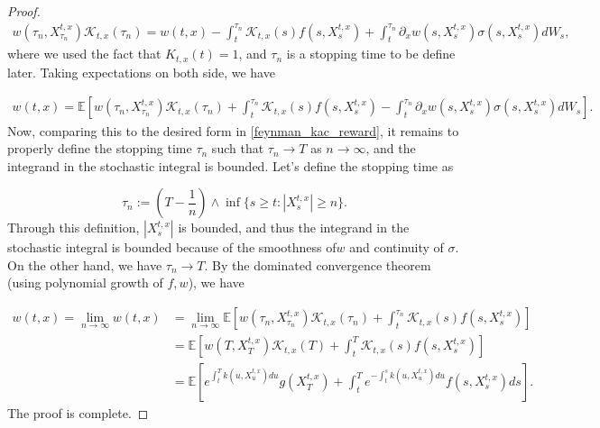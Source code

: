 \documentclass{article}
\begin{document}
\begin{proof}
\begin{equation*}
\begin{aligned}
w(\tau_n,X_{\tau_n}^{t,x})\mathcal{K}_{t,x}(\tau_n)=w(t,x)-\int_t^{\tau_n}\mathcal{K}_{t,x}(s)f(s,X_s^{t,x})+\int_t^{\tau_n}\partial_xw(s,X_s^{t,x})\sigma(s,X_s^{t,x})dW_s,
\end{aligned}
\end{equation*}
where we used the fact that $K_{t,x}(t)=1$, and $\tau_n$ is a stopping time to be define later. Taking expectations on both side, we have

\begin{equation*}
\begin{aligned}
w(t,x)=\mathbb{E}\left[w(\tau_n,X_{\tau_n}^{t,x})\mathcal{K}_{t,x}(\tau_n)+\int_t^{\tau_n}\mathcal{K}_{t,x}(s)f(s,X_s^{t,x})-\int_t^{\tau_n}\partial_xw(s,X_s^{t,x})\sigma(s,X_s^{t,x})dW_s\right].
\end{aligned}
\end{equation*}
Now, comparing this to the desired form in \eqref{feynman_kac_reward}, it remains to properly define the stopping time $\tau_n$ such that $\tau_n\rightarrow T$ as $n\rightarrow\infty$, and the integrand in the stochastic integral is bounded. Let's define the stopping time as

\begin{equation*}
\tau_n:=(T-\frac{1}{n})\wedge \inf \{s\geq t:|X_s^{t,x}|\geq n\}.
\end{equation*}
Through this definition, $|X_s^{t,x}|$ is bounded, and thus the integrand in the stochastic integral is bounded because of the smoothness of$w$ and continuity of $\sigma$. On the other hand, we have $\tau_n\rightarrow T$. By the dominated convergence theorem (using polynomial growth of $f,w$), we have

\begin{equation*}
\begin{aligned}
w(t,x)=\lim_{n\rightarrow\infty}w(t,x)&=\lim_{n\rightarrow\infty}\mathbb{E}\left[w(\tau_n,X_{\tau_n}^{t,x})\mathcal{K}_{t,x}(\tau_n)+\int_t^{\tau_n}\mathcal{K}_{t,x}(s)f(s,X_s^{t,x})\right]\\
&=\mathbb{E}\left[w(T,X_{T}^{t,x})\mathcal{K}_{t,x}(T)+\int_t^{T}\mathcal{K}_{t,x}(s)f(s,X_s^{t,x})\right]\\
&=\mathbb{E}\left[e^{\int_t^Tk(u,X_u^{t,x})du}g(X_T^{t,x})+\int^T_te^{-\int^s_tk(u,X_u^{t,x})du}f(s,X_s^{t,x})ds\right].
\end{aligned}
\end{equation*}
The proof is complete.
\end{proof}
\end{document}
